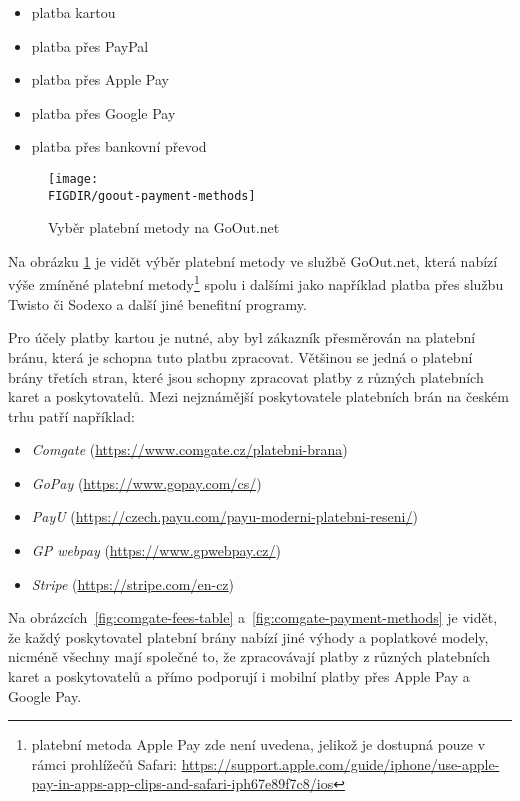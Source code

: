\begin{itemize}
    \item platba kartou
    \item platba přes PayPal
    \item platba přes Apple Pay
    \item platba přes Google Pay
    \item platba přes bankovní převod
\end{itemize}

\begin{figure}[H]
    \texttt{[image: \\FIGDIR/goout-payment-methods]}
    \centering
    \caption{Vyběr platební metody na GoOut.net}
    \label{fig:goout-payment-methods}
\end{figure}

Na obrázku \ref{fig:goout-payment-methods} je vidět výběr platební metody ve službě GoOut.net, která nabízí výše zmíněné platební metody\footnote{platební metoda Apple Pay zde není uvedena, jelikož je dostupná pouze v rámci prohlížečů Safari: \url{https://support.apple.com/guide/iphone/use-apple-pay-in-apps-app-clips-and-safari-iph67e89f7c8/ios}} spolu i dalšími jako například platba přes službu Twisto či Sodexo a další jiné benefitní programy.

Pro účely platby kartou je nutné, aby byl zákazník přesměrován na platební bránu, která je schopna tuto platbu zpracovat.
Většinou se jedná o platební brány třetích stran, které jsou schopny zpracovat platby z různých platebních karet a poskytovatelů.
Mezi nejznámější poskytovatele platebních brán na českém trhu patří například:

\begin{itemize}
    \item \emph{Comgate} (\url{https://www.comgate.cz/platebni-brana})
    \item \emph{GoPay} (\url{https://www.gopay.com/cs/})
    \item \emph{PayU} (\url{https://czech.payu.com/payu-moderni-platebni-reseni/})
    \item \emph{GP webpay} (\url{https://www.gpwebpay.cz/})
    \item \emph{Stripe} (\url{https://stripe.com/en-cz})
\end{itemize}

Na obrázcích~\ref{fig:comgate-fees-table} a~\ref{fig:comgate-payment-methods} je vidět, že každý poskytovatel platební brány nabízí jiné výhody a poplatkové modely, nicméně všechny mají společné to, že zpracovávají platby z různých platebních karet a poskytovatelů a přímo podporují i mobilní platby přes Apple Pay a Google Pay.

